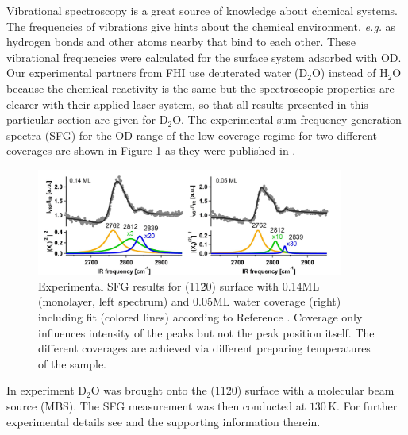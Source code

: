 \documentclass[11pt,DIV=13,BCOR=5mm,a4paper,headinclude]{scrbook}
\begin{document}
Vibrational spectroscopy is a great source of knowledge about chemical systems.
The frequencies of vibrations give hints about the chemical environment, \textit{e.g.} as hydrogen bonds and other atoms nearby that bind to each other.
These vibrational frequencies were calculated for the surface system adsorbed with OD.
Our experimental partners from FHI use deuterated water (D$_2$O) instead of H$_2$O because the chemical reactivity is the same but the spectroscopic properties are clearer with their applied laser system, so that all results presented in this particular section are given for D$_2$O.
The experimental sum frequency generation spectra (SFG) for the OD range of the low coverage regime for two different coverages are shown in Figure \ref{abb:exp-sfg} as they were published in \cite{Heiden11-20_2018}.
\begin{figure}[!h]
 \centering
\includegraphics[width=0.9\textwidth]{figures/11-20/SFG_fit.jpg}
 \caption{Experimental SFG results for (11\=20) surface with 0.14ML (monolayer, left spectrum) and 0.05ML water coverage (right) including fit (colored lines) according to Reference \cite{Heiden11-20_2018}.
 Coverage only influences intensity of the peaks but not the peak position itself.
The different coverages are achieved via different preparing temperatures of the sample.}
        \label{abb:exp-sfg}
 \end{figure}


In experiment D$_2$O was brought onto the (11\=20) surface with a molecular beam source (MBS).
The SFG measurement was then conducted at $130\,$K.
For further experimental details see \cite{Heiden11-20_2018} and the supporting information therein.
\\
\\
\end{document}
